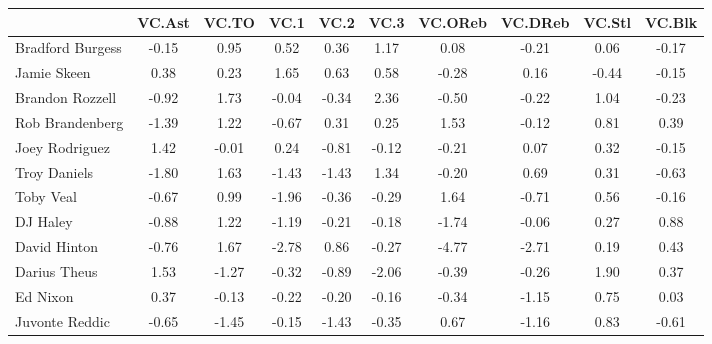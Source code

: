 \documentclass[10pt,letterpaper]{article}
\begin{document}
\begin{table}[ht]
\begin{center}
\begin{tabular}{lccccccccc}
  \hline
 & VC.Ast & VC.TO & VC.1 & VC.2 & VC.3 & VC.OReb & VC.DReb & VC.Stl & VC.Blk \\ 
  \hline
Bradford Burgess & -0.15 & 0.95 & 0.52 & 0.36 & 1.17 & 0.08 & -0.21 & 0.06 & -0.17 \\ 
  Jamie Skeen & 0.38 & 0.23 & 1.65 & 0.63 & 0.58 & -0.28 & 0.16 & -0.44 & -0.15 \\ 
  Brandon Rozzell & -0.92 & 1.73 & -0.04 & -0.34 & 2.36 & -0.50 & -0.22 & 1.04 & -0.23 \\ 
  Rob Brandenberg & -1.39 & 1.22 & -0.67 & 0.31 & 0.25 & 1.53 & -0.12 & 0.81 & 0.39 \\ 
  Joey Rodriguez & 1.42 & -0.01 & 0.24 & -0.81 & -0.12 & -0.21 & 0.07 & 0.32 & -0.15 \\ 
  Troy Daniels & -1.80 & 1.63 & -1.43 & -1.43 & 1.34 & -0.20 & 0.69 & 0.31 & -0.63 \\ 
  Toby Veal & -0.67 & 0.99 & -1.96 & -0.36 & -0.29 & 1.64 & -0.71 & 0.56 & -0.16 \\ 
  DJ Haley & -0.88 & 1.22 & -1.19 & -0.21 & -0.18 & -1.74 & -0.06 & 0.27 & 0.88 \\ 
  David Hinton & -0.76 & 1.67 & -2.78 & 0.86 & -0.27 & -4.77 & -2.71 & 0.19 & 0.43 \\ 
  Darius Theus & 1.53 & -1.27 & -0.32 & -0.89 & -2.06 & -0.39 & -0.26 & 1.90 & 0.37 \\ 
  Ed Nixon & 0.37 & -0.13 & -0.22 & -0.20 & -0.16 & -0.34 & -1.15 & 0.75 & 0.03 \\ 
  Juvonte Reddic & -0.65 & -1.45 & -0.15 & -1.43 & -0.35 & 0.67 & -1.16 & 0.83 & -0.61 \\ 
   \hline
\end{tabular}
\end{center}
\end{table}
\end{document}
